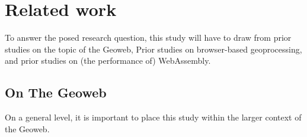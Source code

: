 
\newpage

\section{Related work}

To answer the posed research question, this study will have to draw from prior studies on the topic of the Geoweb, Prior studies on browser-based geoprocessing, and prior studies on (the performance of) WebAssembly.

\subsection{On The Geoweb}
\label{sec:geoweb}

%





On a general level, it is important to place this study within the larger context of the Geoweb. 

